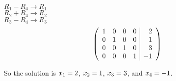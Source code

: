 \documentclass{ximera}
\begin{document}
\begin{exercise}
\begin{prompt}
$R_1-R_4  \rightarrow R_1$  \\  
$R_2+R_4  \rightarrow R_2$ \\
$R_3-R_4  \rightarrow R_3$
\[
\left(\begin{array}{rrrr|r}
     1 &  0 &  0 &   0 &  {2} \\
     0 &  1 &  0 &   0 &  {1} \\
     0 &  0 &  1 &   0 &  {3} \\
     0 &  0 &  0 &   1 & {-1} 
\end{array}\right)
\]

So the solution is 
$x_1={2}$, 
$x_2={1}$,
$x_3={3}$, and
$x_4={-1}$. 

\end{prompt}

\end{exercise}

%
\end{document}
